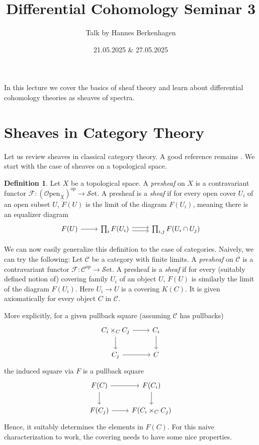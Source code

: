 \documentclass[10pt]{amsart}
\title{Differential Cohomology Seminar 3}
\date{21.05.2025 $\&$ 27.05.2025}
\author{Talk by Hannes Berkenhagen}
\newcommand{\C}{\mathscr{C}}
\newcommand{\set}{\mathscr{S}\mathrm{et}}
\newcommand{\Open}{\mathscr{O}\mathrm{pen}}
\theoremstyle{definition}
\newtheorem{definition}[equation]{Definition}
\theoremstyle{remark}
\begin{document}
\maketitle

	\maketitle
	
	In this lecture we cover the basics of sheaf theory and learn about differential cohomology theories as sheaves of spectra. 
	
	\section{Sheaves in Category Theory}
	Let us review sheaves in classical category theory. A good reference remains \cite{maclanemoerdijk1994topos}. We start with  the case of sheaves on a topological space. 
	
	\begin{definition}
		Let $X$ be a topological space. A \emph{presheaf} on $X$ is a contravariant functor $\mathscr{F} : (\Open_X)^{op} \to \set$. A presheaf is a \emph{sheaf} if for every open cover $U_i$ of an open subset $U$, $F(U)$ is the limit of the diagram $F(U_i)$, meaning there is an equalizer diagram 
		\[
		\begin{tikzcd}
			F(U) \arrow[r] & \prod_i F(U_i) \arrow[r, shift left=1] \arrow[r, shift right = 1] &   \prod_{i,j} F(U_i \cap U_j) 
		\end{tikzcd}
		\]
	\end{definition}
	
	We can now easily generalize this definition to the case of categories. Naively, we can try the following: Let $\C$ be a category with finite limits. A \emph{presheaf} on $\C$ is a contravariant functor $\mathscr{F} : \C^{op} \to \set$. A presheaf is a \emph{sheaf} if for every (suitably defined notion of) covering family $U_i$ of an object $U$, $F(U)$ is similarly the limit of the diagram $F(U_i)$. Here $U_i \to U$ is a covering $K(C)$. It is given axiomatically for every object $C$ in $\C$.
	
	More explicitly, for a given pullback square (assuming $\C$ has pullbacks) 
	\[
	\begin{tikzcd} 
		C_i \times_{C} C_j \arrow[r] \arrow[d] & C_i \arrow[d] \\
		C_j \arrow[r] & C
	\end{tikzcd}
	\]
	the induced square via $F$ is a pullback square
	\[
	\begin{tikzcd} 
		F(C) \arrow[r] \arrow[d] & F(C_i) \arrow[d] \\
		F(C_j) \arrow[r] & F(C_i \times_{C} C_j)
	\end{tikzcd}
	\]
	Hence, it suitably determines the elements in $F(C)$. For this naive characterization to work, the covering needs to have some nice properties.
	
\end{document}
